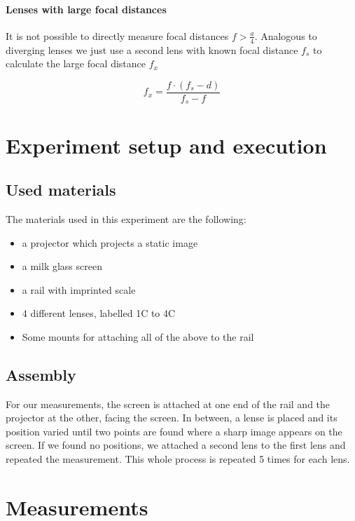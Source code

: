 \documentclass{scrreprt}
\begin{document}
\paragraph{Lenses with large focal distances}
It is not possible to directly measure focal distances $f > \frac{a}{4}$. Analogous to diverging lenses we just use a second lens with known focal distance $f_s$ to calculate the large focal distance $f_x$

\begin{equation}
f_x = \frac{f \cdot \left( f_s - d\right)}{f_s - f}
\end{equation}

\section{Experiment setup and execution}

\subsection{Used materials}
The materials used in this experiment are the following:
\begin{itemize}
\item a projector which projects a static image
\item a milk glass screen
\item a rail with imprinted scale
\item 4 different lenses, labelled 1C to 4C
\item Some mounts for attaching all of the above to the rail
\end{itemize}
\subsection{Assembly}
For our measurements, the screen is attached at one end of the rail and the projector at the other, facing the screen. In between, a lense is placed and its position varied until two points are found where a sharp image appears on the screen. If we found no positions, we attached a second lens to the first lens and repeated the measurement. This whole process is repeated 5 times for each lens.

\section{Measurements}
\end{document}
